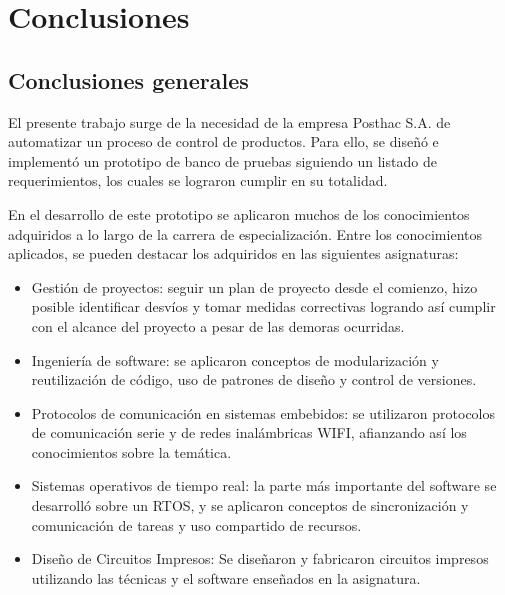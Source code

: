 
\chapter{Conclusiones} %

\label{Chapter5} %




\section{Conclusiones generales }

El presente trabajo surge de la necesidad de la empresa Posthac S.A. de automatizar un proceso de control de productos. Para ello, se diseñó e implementó un prototipo de banco de pruebas siguiendo un listado de requerimientos, los cuales se lograron cumplir en su totalidad.

En el desarrollo de este prototipo se aplicaron muchos de los conocimientos adquiridos a lo largo de la carrera de especialización. Entre los conocimientos aplicados, se pueden destacar los adquiridos en las siguientes asignaturas:

\begin{itemize}
\item Gestión de proyectos: seguir un plan de proyecto desde el comienzo, hizo posible identificar desvíos y tomar medidas correctivas logrando así cumplir con el alcance del proyecto a pesar de las demoras ocurridas.
\item Ingeniería de software: se aplicaron conceptos de modularización y reutilización de código, uso de patrones de diseño y control de versiones.
\item Protocolos de comunicación en sistemas embebidos: se utilizaron protocolos de comunicación serie y de redes inalámbricas WIFI, afianzando así los conocimientos sobre la temática.
\item Sistemas operativos de tiempo real: la parte más importante del software se desarrolló sobre un RTOS, y se aplicaron conceptos de sincronización y comunicación de tareas y uso compartido de recursos.
\item Diseño de Circuitos Impresos: Se diseñaron y fabricaron circuitos impresos utilizando las técnicas y el software enseñados en la asignatura.
\end{itemize}

